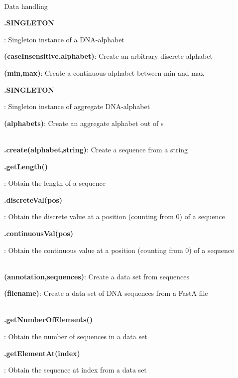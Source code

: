 \documentclass[10pt]{scrartcl}
\newcommand{\entry}[3]{{\item[]\bfseries #1#2}: #3}
\newcommand{\entrys}[3]{\item[\emph{static}] {\bfseries {#1#2}}: #3}
\newcommand{\entryn}[3]{\item[new] {\bfseries {#1#2}}: #3}
\newcommand{\sep}{\\~\vspace{-0.1cm}}
\begin{document}
\thispagestyle{empty}


\renewcommand{\section}[1]{{
~\vspace{-0.2cm}

\large\sfb #1\\}


}
\begin{flushleft}
\footnotesize
\section{Data handling}
\begin{itemize*}
\entry{\DNAAlphabet}{.SINGLETON}{Singleton instance of a DNA-alphabet}

\entryn{\DiscreteAlphabet}{(caseInsensitive,alphabet)}{Create an arbitrary discrete alphabet}

\entryn{\ContinuousAlphabet}{(min,max)}{Create a continuous alphabet between min and max}

\entry{\DNAAlphabetContainer}{.SINGLETON}{Singleton instance of aggregate DNA-alphabet}

\entryn{\AlphabetContainer}{(alphabets)}{Create an aggregate alphabet out of \Alphabet s}\sep

\entrys{\Sequence}{.create(alphabet,string)}{Create a sequence from a string}

\entry{\Sequence}{.getLength()}{Obtain the length of a sequence}

\entry{\Sequence}{.discreteVal(pos)}{Obtain the discrete value at a position (counting from 0) of a sequence}

\entry{\Sequence}{.continuousVal(pos)}{Obtain the continuous value at a position (counting from 0) of a sequence}\sep

\entryn{\DataSet}{(annotation,sequences)}{Create a data set from sequences}

\entryn{\DNADataSet}{(filename)}{Create a data set of DNA sequences from a FastA file}\sep

\entry{\DataSet}{.getNumberOfElements()}{Obtain the number of sequences in a data set}

\entry{\DataSet}{.getElementAt(index)}{Obtain the sequence at index from a data set}


\end{itemize*}
\end{flushleft}
\end{document}
